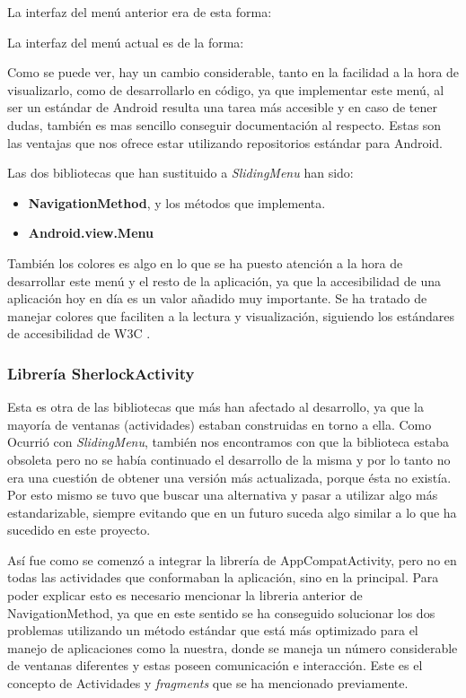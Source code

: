 La interfaz del menú anterior era de esta forma:


La interfaz del menú actual es de la forma:


Como se puede ver, hay un cambio considerable, tanto en la facilidad a la hora de visualizarlo, como de desarrollarlo en código, ya que implementar este menú, al ser un estándar de Android resulta una tarea más accesible y en caso de tener dudas, también es mas sencillo conseguir documentación al respecto. Estas son las ventajas que nos ofrece estar utilizando repositorios estándar para Android.

Las dos bibliotecas que han sustituido a \textit{SlidingMenu} han sido:

\begin{itemize}
\item \textbf{NavigationMethod}, y los métodos que implementa.
\item \textbf{Android.view.Menu}
\end{itemize}

También los colores es algo en lo que se ha puesto atención a la hora de desarrollar este menú y el resto de la aplicación, ya que la accesibilidad de una aplicación hoy en día es un valor añadido muy importante. Se ha tratado de manejar colores que faciliten a la lectura y visualización, siguiendo los estándares de accesibilidad de W3C \cite{w3c}.

\subsubsection{Librería SherlockActivity}

Esta es otra de las bibliotecas que más han afectado al desarrollo, ya que la mayoría de ventanas (actividades) estaban construidas en torno a ella. Como Ocurrió con \textit{SlidingMenu}, también  nos encontramos con que la biblioteca estaba obsoleta pero no se había continuado el desarrollo de la misma y por lo tanto no era una cuestión de obtener una versión más actualizada, porque ésta no existía. Por esto mismo se tuvo que buscar una alternativa y pasar a utilizar algo más estandarizable, siempre evitando que en un futuro suceda algo similar a lo que ha sucedido en este proyecto.

Así fue como se comenzó a integrar la librería de AppCompatActivity, pero no en todas las actividades que conformaban la aplicación, sino en la principal. Para poder explicar esto es necesario mencionar la libreria anterior de NavigationMethod, ya que en este sentido se ha conseguido solucionar los dos problemas utilizando un método estándar que está más optimizado para el manejo de aplicaciones como la nuestra, donde se maneja un número considerable de ventanas diferentes y estas poseen comunicación e interacción. Este es el concepto de Actividades y \textit{fragments} que se ha mencionado previamente.

